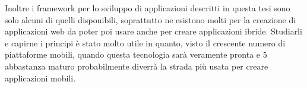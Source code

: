     Inoltre i frame\-work per lo sviluppo di applicazioni \crossplat{} descritti
    in questa tesi sono solo alcuni di quelli disponibili, soprattutto ne
    esistono molti per la creazione di applicazioni web da poter poi usare
    anche per creare applicazioni ibride. Studiarli e capirne i principi è
    stato molto utile in quanto, visto il crescente numero di piattaforme
    mobili, quando questa tecnologia sarà veramente pronta e \html{}5 abbastanza
    maturo probabilmente diverrà la strada più usata per creare applicazioni
    mobili.
